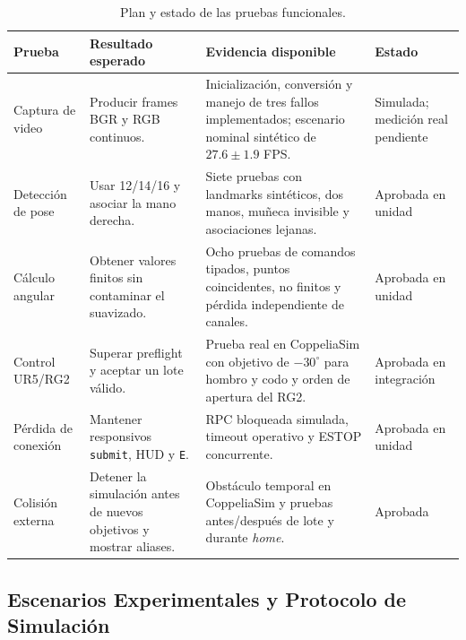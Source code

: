 \begin{table}[H]
    \centering
    \renewcommand{\arraystretch}{1.2}
    \small
    \begin{tabularx}{\textwidth}{
        >{\raggedright\arraybackslash}p{2.6cm}
        >{\raggedright\arraybackslash}X
        >{\raggedright\arraybackslash}X
        >{\raggedright\arraybackslash}p{2.2cm}}
        \toprule
        \textbf{Prueba} & \textbf{Resultado esperado} &
        \textbf{Evidencia disponible} & \textbf{Estado} \\
        \midrule
        Captura de video &
        Producir frames BGR y RGB continuos. &
        Inicialización, conversión y manejo de tres fallos implementados;
        escenario nominal sintético de $27.6\pm1.9$ FPS. &
        Simulada; medición real pendiente \\
        Detección de pose &
        Usar 12/14/16 y asociar la mano derecha. &
        Siete pruebas con landmarks sintéticos, dos manos, muñeca invisible y
        asociaciones lejanas. &
        Aprobada en unidad \\
        Cálculo angular &
        Obtener valores finitos sin contaminar el suavizado. &
        Ocho pruebas de comandos tipados, puntos coincidentes, no finitos y
        pérdida independiente de canales. &
        Aprobada en unidad \\
        Control UR5/RG2 &
        Superar preflight y aceptar un lote válido. &
        Prueba real en CoppeliaSim con objetivo de $-30^\circ$ para hombro y
        codo y orden de apertura del RG2. &
        Aprobada en integración \\
        Pérdida de conexión &
        Mantener responsivos \texttt{submit}, HUD y \texttt{E}. &
        RPC bloqueada simulada, timeout operativo y ESTOP concurrente. &
        Aprobada en unidad \\
        Colisión externa &
        Detener la simulación antes de nuevos objetivos y mostrar aliases. &
        Obstáculo temporal en CoppeliaSim y pruebas antes/después de lote y
        durante \textit{home}. &
        Aprobada \\
        \bottomrule
    \end{tabularx}
    \caption{Plan y estado de las pruebas funcionales.}
    \label{tab:pruebas_funcionales}
\end{table}

\subsection{Escenarios Experimentales y Protocolo de Simulación}
\label{subsec:escenarios_experimentales}

